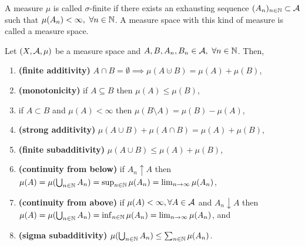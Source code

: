 \begin{dfn}
	A measure $\mu$ is called $\sigma$-finite if there exists an exhausting sequence $(A_n)_{n \in \mathbb{N}} \subset \mathcal{A}$ such that $\mu(A_n) < \infty,\ \forall n \in \mathbb{N}$. A measure space with this kind of measure is called a \sigfin  measure space.
\end{dfn}

\begin{thm}
	Let $(X, \mathcal{A}, \mu)$ be a measure space and $A, B, A_n, B_n \in \mathcal{A},\ \forall n \in \mathbb{N}$. Then,
	\begin{enumerate}
		\item \textbf{(finite additivity)} $A \cap B = \emptyset \implies \mu(A \cupdot B) = \mu(A) + \mu(B)$,
		\item \textbf{(monotonicity)} if $A \subseteq B$ then $\mu(A) \leq \mu(B)$,
		\item if $A \subset B$ and $\mu(A) < \infty$ then $\mu(B\setminus A) = \mu(B) - \mu(A)$,
		\item \textbf{(strong additivity)} $\mu(A \cup B) + \mu(A \cap B) = \mu(A) + \mu(B)$,
		\item \textbf{(finite subadditivity)} $\mu(A \cup B) \leq \mu(A) + \mu(B)$,
		\item \textbf{(continuity from below)} if $A_n \uparrow A$ then $\mu(A) = \mu(\bigcup_{n \in \mathbb{N}} A_n) = \sup_{n\in\mathbb{N}} \mu(A_n) = \lim_{n\to \infty} \mu(A_n)$,
		\item \textbf{(continuity from above)} if $\mu(A) < \infty, \forall A \in \mathcal{A}$ and $A_n \downarrow A$ then $\mu(A) = \mu(\bigcup_{n \in \mathbb{N}} A_n) = \inf_{n\in\mathbb{N}} \mu(A_n) = \lim_{n\to \infty} \mu(A_n)$, and
		\item \textbf{(sigma subadditivity)} $\mu(\bigcup_{n \in \mathbb{N}} A_n) \leq \sum_{n\in \mathbb{N}} \mu(A_n)$.
	\end{enumerate}
\end{thm}

